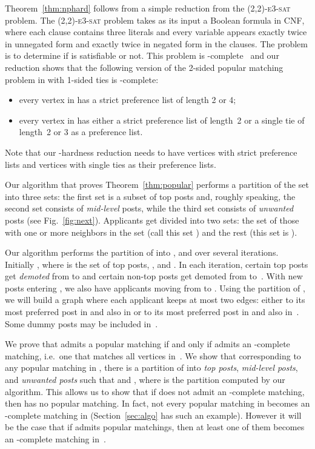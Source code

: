 \documentclass[11pt]{llncs}
\begin{document}
Theorem~\ref{thm:nphard} follows from a simple reduction from the \textsc{(2,2)-e3-sat} problem. The \textsc{(2,2)-e3-sat} problem takes as its input a Boolean formula  in CNF, where each clause contains three literals and every variable appears exactly twice in unnegated form and exactly twice in negated form in the clauses. The problem is to determine if  
is satisfiable or not. This problem is -complete~\cite{BKS03} and our reduction shows that the following
version of the 2-sided popular matching problem in  with 1-sided ties is -complete: 
\begin{itemize}
\item every vertex in  has a strict preference list of length 2 or 4;
\item every vertex in  has either a strict preference list of length~2 or a single tie of length~2 or 3 as a preference list.
\end{itemize}
Note that our -hardness reduction needs  to have  vertices with 
strict preference lists and  vertices with single ties as their preference lists.

Our algorithm that proves Theorem~\ref{thm:popular} performs a partition of the set  into three sets: 
the first set  is a subset of top posts and, roughly speaking, the second set  consists of 
{\em mid-level} posts, while the third set  consists of {\em unwanted} posts 
(see Fig.~\ref{fig:next}). Applicants get divided into two sets: the set of those with one or 
more neighbors in the set  (call this set ) and the rest (this set is 
).  

Our algorithm performs the partition of  into , and  over several iterations. 
Initially , where  is the set of top posts, , and .
In each iteration, certain top posts get {\em demoted} from  to  and certain non-top 
posts get demoted from  to~. With new posts entering , we also have applicants
moving from  to . Using the partition  of 
, we will build a graph  where each applicant keeps at most two edges: either 
to its most preferred post in  and also in  or to its most preferred post in  and 
also in~. Some dummy posts may be included in~.

We prove that  admits a popular matching if and only if  admits an -complete matching,
i.e.\ one that matches all vertices in~. We show that corresponding 
to any popular matching in , there is a partition  of  into 
{\em top posts}, {\em mid-level posts}, and {\em unwanted posts} such that  
and , where  is the partition computed by our algorithm.
This allows us to show that if  does not admit an -complete matching, then  has no 
popular matching. In fact, not every popular matching in  becomes an -complete matching 
in  (Section~\ref{sec:algo} has such an example). However it will be the case that if  
admits popular matchings, then at least one of them becomes an -complete matching in~.
\end{document}
